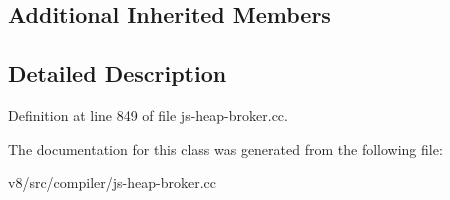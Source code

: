 \subsection*{Additional Inherited Members}


\subsection{Detailed Description}


Definition at line 849 of file js-\/heap-\/broker.\+cc.



The documentation for this class was generated from the following file\+:\begin{DoxyCompactItemize}
\item 
v8/src/compiler/js-\/heap-\/broker.\+cc\end{DoxyCompactItemize}
